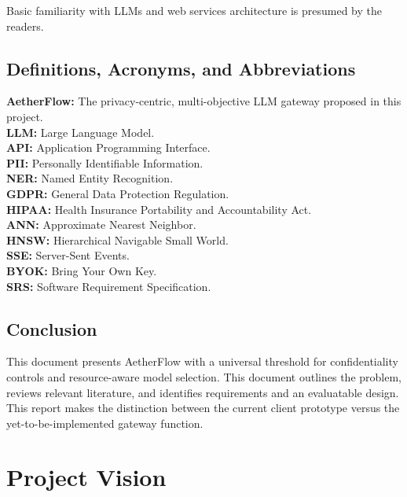\documentclass{FastFyp}
\begin{document}
Basic familiarity with LLMs and web services architecture is presumed by the readers.

\section{Definitions, Acronyms, and Abbreviations}
\label{sec:definitions}

\begin{flushleft}
\setlength{\parindent}{0pt}
\setlength{\parskip}{0pt}
\textbf{AetherFlow:} The privacy-centric, multi-objective LLM gateway proposed in this project. \\
\textbf{LLM:} Large Language Model. \\
\textbf{API:} Application Programming Interface. \\
\textbf{PII:} Personally Identifiable Information. \\
\textbf{NER:} Named Entity Recognition. \\
\textbf{GDPR:} General Data Protection Regulation. \\
\textbf{HIPAA:} Health Insurance Portability and Accountability Act. \\
\textbf{ANN:} Approximate Nearest Neighbor. \\
\textbf{HNSW:} Hierarchical Navigable Small World. \\
\textbf{SSE:} Server-Sent Events. \\
\textbf{BYOK:} Bring Your Own Key. \\
\textbf{SRS:} Software Requirement Specification.
\end{flushleft}

\section{Conclusion}
\label{sec:ch1-conclusion}

This document presents AetherFlow with a universal threshold for confidentiality controls and resource-aware model selection. This document outlines the problem, reviews relevant literature, and identifies requirements and an evaluatable design. This report makes the distinction between the current client prototype versus the yet-to-be-implemented gateway function.
\chapter{Project Vision}
\label{ch:vision}
\end{document}
